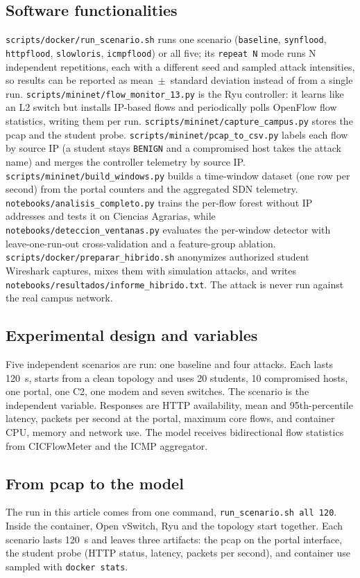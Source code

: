 \documentclass[a4paper,fleqn]{cas-dc}
\begin{document}
\subsection{Software functionalities}
\texttt{scripts/docker/run\_scenario.sh} runs one scenario
(\texttt{baseline}, \texttt{synflood}, \texttt{httpflood},
\texttt{slowloris}, \texttt{icmpflood}) or all five; its
\texttt{repeat N} mode runs N independent repetitions, each with a
different seed and sampled attack intensities, so results can be
reported as mean~$\pm$~standard deviation instead of from a single run.
\texttt{scripts/mininet/flow\_monitor\_13.py} is the Ryu controller: it
learns like an L2 switch but installs IP-based flows and periodically
polls OpenFlow flow statistics, writing them per run.
\texttt{scripts/mininet/capture\_campus.py} stores the pcap and the
student probe. \texttt{scripts/mininet/pcap\_to\_csv.py} labels each
flow by source IP (a student stays \texttt{BENIGN} and a compromised
host takes the attack name) and merges the controller telemetry by
source IP. \texttt{scripts/mininet/build\_windows.py} builds a
time-window dataset (one row per second) from the portal counters and
the aggregated SDN telemetry.
\texttt{notebooks/analisis\_completo.py} trains the per-flow forest
without IP addresses and tests it on Ciencias Agrarias, while
\texttt{notebooks/deteccion\_ventanas.py} evaluates the per-window
detector with leave-one-run-out cross-validation and a feature-group
ablation.
\texttt{scripts/docker/preparar\_hibrido.sh} anonymizes authorized
student Wireshark captures, mixes them with simulation attacks, and
writes \texttt{notebooks/resultados/informe\_hibrido.txt}. The attack
is never run against the real campus network.

\subsection{Experimental design and variables}
Five independent scenarios are run: one baseline and four attacks.
Each lasts 120~s, starts from a clean topology and uses 20 students,
10 compromised hosts, one portal, one C2, one modem and seven
switches. The scenario is the independent variable. Responses are
HTTP availability, mean and 95th-percentile latency, packets per
second at the portal, maximum core flows, and container CPU, memory
and network use. The model receives bidirectional flow statistics
from CICFlowMeter and the ICMP aggregator.

\subsection{From pcap to the model}
The run in this article comes from one command,
\texttt{run\_scenario.sh all 120}. Inside the container, Open
vSwitch, Ryu and the topology start together. Each scenario lasts
120~s and leaves three artifacts: the pcap on the portal interface,
the student probe (HTTP status, latency, packets per second), and
container use sampled with \texttt{docker stats}.
\end{document}
